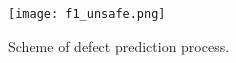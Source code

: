 \documentclass{article}
\begin{document}
\begin{figure}[ht] %
\texttt{[image: f1\_unsafe.png]}
\caption{ Scheme of defect prediction process.}
\label{fig1} %
\end{figure}


\begin{comment}





\end{comment}
\end{document}
